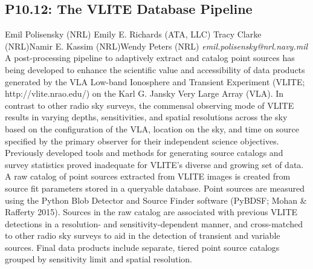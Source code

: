 \documentclass{report}
\begin{document}
\subsection*{P10.12: The VLITE Database Pipeline}
\bigskip
Emil Polisensky (NRL) \newline Emily E. Richards (ATA, LLC) \newline  Tracy Clarke (NRL)\newline  Namir E. Kassim (NRL)\newline Wendy Peters (NRL)\newline  \newline\newline
{\it emil.polisensky@nrl.navy.mil}\newline
\newline\newline
A post-processing pipeline to adaptively extract and catalog point sources has being developed to enhance the scientific value and accessibility of data products generated by the VLA Low-band Ionosphere and Transient Experiment (VLITE; http://vlite.nrao.edu/) on the Karl G. Jansky Very Large Array (VLA). In contrast to other radio sky surveys, the commensal observing mode of VLITE results in varying depths, sensitivities, and spatial resolutions across the sky based on the configuration of the VLA, location on the sky, and time on source specified by the primary observer for their independent science objectives. Previously developed tools and methods for generating source catalogs and survey statistics proved inadequate for VLITE's diverse and growing set of data. A raw catalog of point sources extracted from VLITE images is created from source fit parameters stored in a queryable database. Point sources are measured using the Python Blob Detector and Source Finder software (PyBDSF; Mohan \& Rafferty 2015). Sources in the raw catalog are associated with previous VLITE detections in a resolution- and sensitivity-dependent manner, and cross-matched to other radio sky surveys to aid in the detection of transient and variable sources. Final data products include separate, tiered point source catalogs grouped by sensitivity limit and spatial resolution.\newline
\newpage
\end{document}
